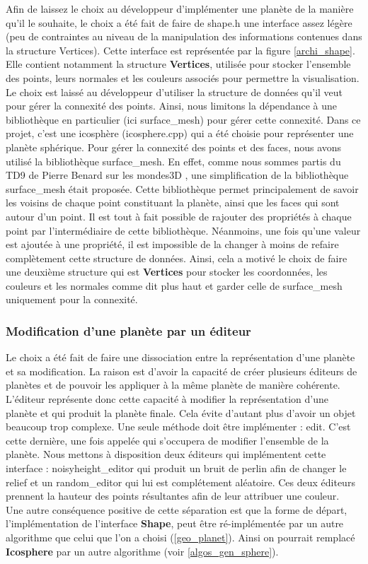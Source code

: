 \documentclass[a4paper]{article}
\begin{document}
Afin de laissez le choix au développeur d'implémenter une planète de la manière qu'il le souhaite, le choix a été fait de faire de shape.h une interface assez légère (peu de contraintes au niveau de la manipulation des informations contenues dans la structure Vertices). Cette interface est représentée par la figure \ref{archi_shape}. Elle contient notamment la structure \textbf{Vertices}, utilisée pour stocker l'ensemble des points, leurs normales et les couleurs associés pour permettre la visualisation. Le choix est laissé au développeur d'utiliser la structure de données qu'il veut pour gérer la connexité des points. Ainsi, nous limitons la dépendance à une bibliothèque en particulier (ici surface\_mesh) pour gérer cette connexité.
Dans ce projet, c'est une icosphère (icosphere.cpp) qui a été choisie pour représenter une planète sphérique. Pour gérer la connexité des points et des faces, nous avons utilisé la bibliothèque surface\_mesh. En effet, comme nous sommes partis du TD9 de Pierre Benard sur les mondes3D \cite{TD_3D}, une simplification de la bibliothèque surface\_mesh était proposée. Cette bibliothèque permet principalement de savoir les voisins de chaque point constituant la planète, ainsi que les faces qui sont autour d'un point. Il est tout à fait possible de rajouter des propriétés à chaque point par l'intermédiaire de cette bibliothèque. Néanmoins, une fois qu'une valeur est ajoutée à une propriété, il est impossible de la changer à moins de refaire complètement cette structure de données. Ainsi, cela a motivé le choix de faire une deuxième structure qui est \textbf{Vertices} pour stocker les coordonnées, les couleurs et les normales comme dit plus haut et garder celle de surface\_mesh uniquement pour la connexité.

\subsubsection{Modification d'une planète par un éditeur}

Le choix a été fait de faire une dissociation entre la représentation d'une planète et sa modification. La raison est d'avoir la capacité de créer plusieurs éditeurs de planètes et de pouvoir les appliquer à la même planète de manière cohérente. L'éditeur représente donc cette capacité à modifier la représentation d'une planète et qui produit la planète finale. Cela évite d'autant plus d'avoir un objet beaucoup trop complexe. Une seule méthode doit être implémenter : edit. C'est cette dernière, une fois appelée qui s'occupera de modifier l'ensemble de la planète. Nous mettons à disposition deux éditeurs qui implémentent cette interface : noisyheight\_editor qui produit un bruit de perlin afin de changer le relief et un random\_editor qui lui est complétement aléatoire. Ces deux éditeurs prennent la hauteur des points résultantes afin de leur attribuer une couleur.\\
Une autre conséquence positive de cette séparation est que la forme de départ, l'implémentation de l'interface \textbf{Shape}, peut être ré-implémentée par un autre algorithme que celui que l'on a choisi (\ref{geo_planet}). Ainsi on pourrait remplacé \textbf{Icosphere} par un autre algorithme (voir \ref{algos_gen_sphere}).\\
\end{document}
